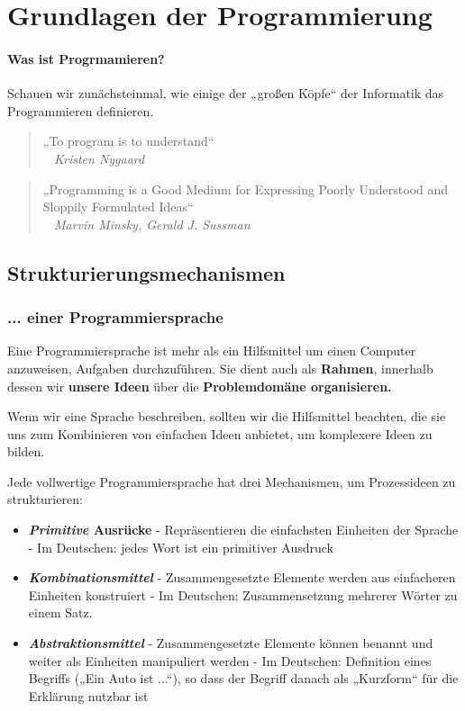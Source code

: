 
\chapter{Grundlagen der Programmierung}
\label{c:grundlagen}
\setcounter{page}{1}
\subsubsection{Was ist Progrmamieren?}

Schauen wir zunächsteinmal, wie einige der „großen Köpfe“ der
Informatik das Programmieren definieren.

\begin{quote}
	„To program is to understand“ \\
	\textit{~ Kristen Nygaard}
\end{quote}

\begin{quote}
	„Programming is a Good Medium for Expressing Poorly
	Understood and Sloppily Formulated Ideas“\\
	\textit{~ Marvin Minsky, Gerald J. Sussman}
\end{quote}

\section{Strukturierungsmechanismen}

\subsection{... einer Programmiersprache}

Eine Programmiersprache ist mehr als ein Hilfsmittel um einen
Computer anzuweisen, Aufgaben durchzuführen.
Sie dient auch als \textbf{Rahmen}, innerhalb dessen wir \textbf{unsere
Ideen} über die \textbf{Problemdomäne organisieren.}

Wenn wir eine Sprache beschreiben, sollten wir
die Hilfsmittel beachten, die sie uns zum
Kombinieren von einfachen Ideen anbietet, um
komplexere Ideen zu bilden.

Jede vollwertige Programmiersprache hat drei Mechanismen,
um Prozessideen zu strukturieren:

\begin{itemize}
	\item \textbf{\textit{Primitive} Ausrücke}
		\subitem - Repräsentieren die einfachsten Einheiten der Sprache
		\subitem - Im Deutschen: jedes Wort ist ein primitiver Ausdruck
	\item \textbf{\textit{Kombinationsmittel}}
		\subitem - Zusammengesetzte Elemente werden aus einfacheren Einheiten
		konstruiert
		\subitem - Im Deutschen: Zusammensetzung mehrerer Wörter zu einem Satz.
	\item \textbf{\textit{Abstraktionsmittel}}
		\subitem - Zusammengesetzte Elemente können benannt und weiter als Einheiten manipuliert werden
		\subitem - Im Deutschen: Definition eines Begriffs („Ein Auto ist ...“), so dass der Begriff danach als „Kurzform“ für die Erklärung nutzbar ist
\end{itemize}

